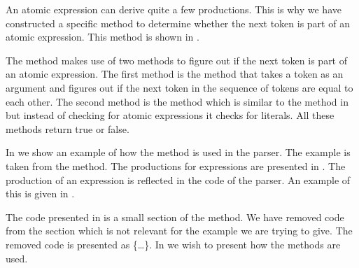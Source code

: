 
An atomic expression can derive quite a few productions. This is why we have
constructed a specific method to determine whether the next token is part of an
atomic expression. This method is shown in .



The method  makes use of two methods to figure out if
the next token is part of an atomic expression. The first method is the
 method that takes a token as an argument and figures out
if the next token in the sequence of tokens are equal to each other. The second
method is the  method which is similar to the method 
in  but instead of checking for atomic expressions it 
checks for literals. All these methods return true or false.

In  we show an example of how the
 method is used in the parser. The example is taken from
the  method. The productions for expressions are presented
in .
The production of an expression is reflected in the code of the parser. An
example of this is given in .




The code presented in  is a small section of the
 method. We have removed code from the section which is
not relevant for the example we are trying to give. The removed code is
presented as \{\ldots\}. In  we wish to present how
the  methods are used.

